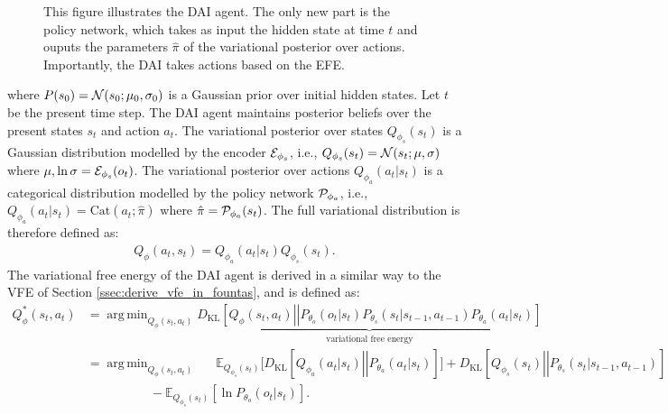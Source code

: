 \documentclass[twoside,11pt]{article}
\let\oldmathcal\mathcal
\renewcommand{\mathcal}[1]{%
  \IfSubStr{ABCDEFGHIJKLMNOPQRSTUVWXYZ}{#1}{\oldmathcal{#1}}{\mathdutchcal{#1}}
}
\newcommand{\kl}[2]{D_{\mathrm{KL}} \left[ \left. \left. #1 \right|\right| #2 \right] }
\DeclareMathOperator*{\argmin}{arg\,min}
\providecommand{\DIFaddbegin}{} %
\providecommand{\DIFaddend}{} %
\providecommand{\DIFaddendFL}{} %
\begin{document}
\begin{figure}[H]
\begin{center}
	\DIFaddendFL \end{center}
  \caption{This figure illustrates the DAI agent. The only new part is the policy network, which takes as input the hidden state at time $t$ and ouputs the parameters $\hat{\pi}$ of the variational posterior over actions. Importantly, the DAI takes actions based on the EFE.}
   \label{fig:DAI}
\end{figure}

\DIFaddbegin \noindent \DIFaddend where $P(s_0) = \mathcal{N}(s_0;\mu_0,\sigma_0)$ is a Gaussian prior over initial hidden states. Let $t$ be the present time step. The DAI agent maintains posterior beliefs over the present states $s_t$ and action $a_t$. The variational posterior over states $Q_{\phi_s}(s_t)$ is a Gaussian distribution modelled by the encoder $\mathcal{E}_{\phi_s}$, i.e., $Q_{\phi_s}(s_t) = \mathcal{N}(s_t;\mu, \sigma)$ where $\mu, \ln\sigma = \mathcal{E}_{\phi_s}(o_t)$. The variational posterior over actions $Q_{\phi_a}(a_t|s_t)$ is a categorical distribution modelled by the policy network $\mathcal{P}_{\phi_a}$, i.e., $Q_{\phi_a}(a_t|s_t) = \text{Cat}(a_t;\hat{\pi})$ where $\hat{\pi} = \mathcal{P}_{\phi_a}(s_t)$. The full variational distribution is therefore defined as:
\begin{align*}
Q_{\phi}(a_t,s_t) = Q_{\phi_a}(a_t|s_t)Q_{\phi_s}(s_t).
\end{align*}
The variational free energy of the DAI agent is derived in a similar way to the VFE of Section \ref{ssec:derive_vfe_in_fountas}, and is defined as:
\begin{align}
Q^*_{\phi}(s_t, a_t) &= \argmin_{Q_{\phi}(s_t, a_t)}\underbrace{\kl{Q_{\phi}(s_t, a_t)}{P_{\theta_o}(o_t|s_t)P_{\theta_s}(s_t|s_{t-1},a_{t-1})P_{\theta_a}(a_t|s_t)}}_{\text{variational free energy}}\label{eq:vfe_defi_dai}\\
&= \argmin_{Q_{\phi}(s_t, a_t)} \quad\,\,\, \mathbb{E}_{Q_{\phi_s}(s_t)}\big[\kl{Q_{\phi_a}(a_t|s_t)}{P_{\theta_a}(a_t|s_t)}\big] + \kl{Q_{\phi_s}(s_t)}{P_{\theta_s}(s_t|s_{t-1},a_{t-1})}\nonumber\\
&\quad\qquad\qquad - \mathbb{E}_{Q_{\phi_s}(s_t)}[\ln P_{\theta_o}(o_t|s_t)].\nonumber
\end{align}
\end{document}
